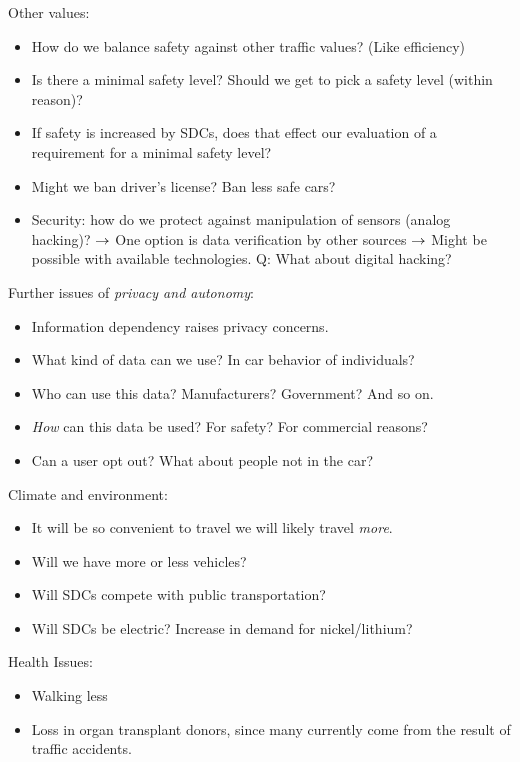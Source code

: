 Other values:
\begin{itemize}
    \item How do we balance safety against other traffic values? (Like efficiency)
    \item Is there a minimal safety level? Should we get to pick a safety level (within reason)?
    \item If safety is increased by SDCs, does that effect our evaluation of a requirement for a minimal safety level?
    \item Might we ban driver's license? Ban less safe cars?
    \item Security: how do we protect against manipulation of sensors (analog hacking)?
    $\rightarrow$ One option is data verification by other sources
    $\rightarrow$ Might be possible with available technologies.
    Q: What about digital hacking? 
\end{itemize}

Further issues of {\it privacy and autonomy}:
\begin{itemize}
    \item Information dependency raises privacy concerns.
    \item What kind of data can we use? In car behavior of individuals?
    \item Who can use this data? Manufacturers? Government? And so on.
    \item {\it How} can this data be used? For safety? For commercial reasons?
    \item Can a user opt out? What about people not in the car?
\end{itemize}

Climate and environment:
\begin{itemize}
    \item It will be so convenient to travel we will likely travel {\it more}.
    \item Will we have more or less vehicles?
    \item Will SDCs compete with public transportation?
    \item Will SDCs be electric? Increase in demand for nickel/lithium?
\end{itemize}

Health Issues:
\begin{itemize}
    \item Walking less
    \item Loss in organ transplant donors, since many currently come from the result of traffic accidents.
\end{itemize}

